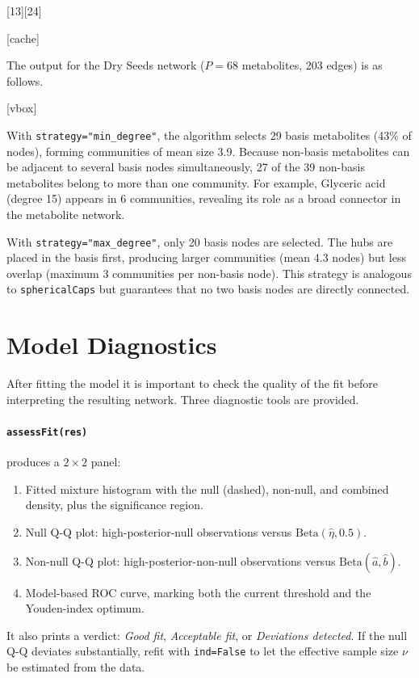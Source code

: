 \documentclass[a4paper,10pt]{article}
\begin{document}
[13][24]

[cache]

The output for the Dry Seeds network ($P=68$ metabolites, 203 edges) is as follows.

[vbox]

With \texttt{strategy="min\_degree"}, the algorithm selects 29 basis metabolites (43\% of nodes), forming communities of mean size 3.9.  Because non-basis metabolites can be adjacent to several basis nodes simultaneously, 27 of the 39 non-basis metabolites belong to more than one community.  For example, Glyceric acid (degree 15) appears in 6 communities, revealing its role as a broad connector in the metabolite network.

With \texttt{strategy="max\_degree"}, only 20 basis nodes are selected.  The hubs are placed in the basis first, producing larger communities (mean 4.3 nodes) but less overlap (maximum 3 communities per non-basis node).  This strategy is analogous to \texttt{sphericalCaps} but guarantees that no two basis nodes are directly connected.


\section{Model Diagnostics}

After fitting the model it is important to check the quality of the fit before interpreting the resulting network.  Three diagnostic tools are provided.

\paragraph{\texttt{assessFit(res)}} produces a $2\times 2$ panel:
\begin{enumerate}
  \item Fitted mixture histogram with the null (dashed), non-null, and combined density, plus the significance region.
  \item Null Q-Q plot: high-posterior-null observations versus $\mathrm{Beta}(\hat\eta, 0.5)$.
  \item Non-null Q-Q plot: high-posterior-non-null observations versus $\mathrm{Beta}(\hat a, \hat b)$.
  \item Model-based ROC curve, marking both the current threshold and the Youden-index optimum.
\end{enumerate}
It also prints a verdict: \textit{Good fit}, \textit{Acceptable fit}, or \textit{Deviations detected}.  If the null Q-Q deviates substantially, refit with \texttt{ind=False} to let the effective sample size $\nu$ be estimated from the data.
\end{document}
